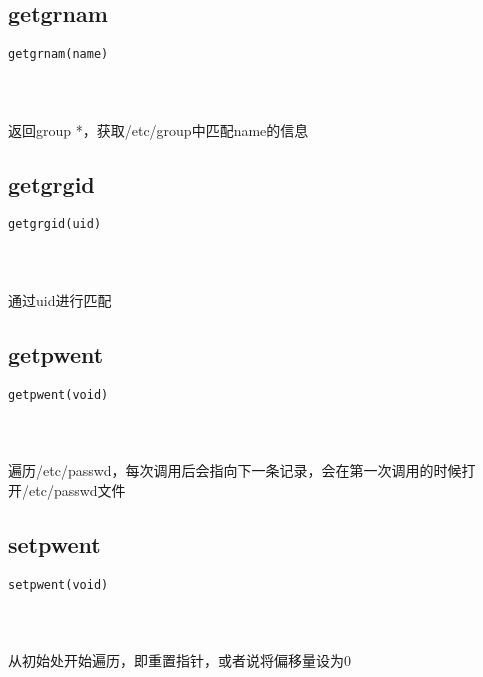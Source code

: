 \documentclass[10pt,a4paper]{article}
\begin{document}
\subsection{getgrnam}
\begin{spacing}{2.0}
\lstset{language=C,numbers=none}
\begin{lstlisting}
getgrnam(name)
\end{lstlisting}
{\large\color[rgb]{0.2,0.4,0.6}{name:}}
\paragraph{ \ \ }返回group *，获取/etc/group中匹配name的信息
\end{spacing}

\subsection{getgrgid}
\begin{spacing}{2.0}
\lstset{language=C,numbers=none}
\begin{lstlisting}
getgrgid(uid)
\end{lstlisting}
{\large\color[rgb]{0.2,0.4,0.6}{uid:}}
\paragraph{ \ \ }通过uid进行匹配
\end{spacing}

\subsection{getpwent}
\begin{spacing}{2.0}
\lstset{language=C,numbers=none}
\begin{lstlisting}
getpwent(void)
\end{lstlisting}
{\large\color[rgb]{0.2,0.4,0.6}{void:}}
\paragraph{ \ \ }遍历/etc/passwd，每次调用后会指向下一条记录，会在第一次调用的时候打开/etc/passwd文件
\end{spacing}

\subsection{setpwent}
\begin{spacing}{2.0}
\lstset{language=C,numbers=none}
\begin{lstlisting}
setpwent(void)
\end{lstlisting}
{\large\color[rgb]{0.2,0.4,0.6}{void:}}
\paragraph{ \ \ }从初始处开始遍历，即重置指针，或者说将偏移量设为0
\end{spacing}
\end{document}

